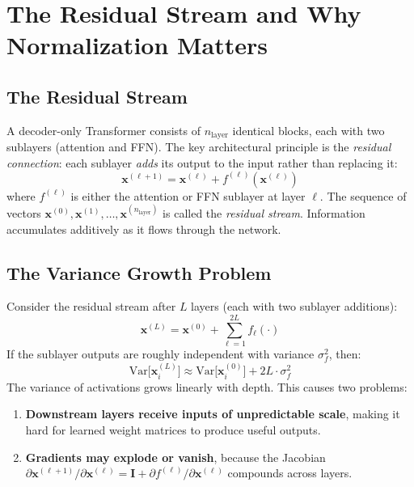 \documentclass[11pt, a4paper]{article}
\theoremstyle{definition}
\newcommand{\vx}{\bm{x}}
\newcommand{\mI}{\bm{I}}
\newcommand{\Var}{\mathrm{Var}}
\newcommand{\nlayer}{n_{\text{layer}}}
\begin{document}
\section{The Residual Stream and Why Normalization Matters}

\subsection{The Residual Stream}

A decoder-only Transformer consists of $\nlayer$ identical blocks, each with two sublayers (attention and FFN). The key architectural principle is the \emph{residual connection}: each sublayer \emph{adds} its output to the input rather than replacing it:
\begin{equation}\label{eq:residual}
    \vx^{(\ell+1)} = \vx^{(\ell)} + f^{(\ell)}(\vx^{(\ell)})
\end{equation}
where $f^{(\ell)}$ is either the attention or FFN sublayer at layer $\ell$. The sequence of vectors $\vx^{(0)}, \vx^{(1)}, \ldots, \vx^{(\nlayer)}$ is called the \emph{residual stream}. Information accumulates additively as it flows through the network.

\subsection{The Variance Growth Problem}

Consider the residual stream after $L$ layers (each with two sublayer additions):
\begin{equation}
    \vx^{(L)} = \vx^{(0)} + \sum_{\ell=1}^{2L} f_\ell(\cdot)
\end{equation}
If the sublayer outputs are roughly independent with variance $\sigma^2_f$, then:
\begin{equation}
    \Var\bigl[\vx^{(L)}_i\bigr] \approx \Var\bigl[\vx^{(0)}_i\bigr] + 2L \cdot \sigma^2_f
\end{equation}
The variance of activations grows linearly with depth. This causes two problems:
\begin{enumerate}
    \item \textbf{Downstream layers receive inputs of unpredictable scale}, making it hard for learned weight matrices to produce useful outputs.
    \item \textbf{Gradients may explode or vanish}, because the Jacobian $\partial \vx^{(\ell+1)} / \partial \vx^{(\ell)} = \mI + \partial f^{(\ell)} / \partial \vx^{(\ell)}$ compounds across layers.
\end{enumerate}
\end{document}
